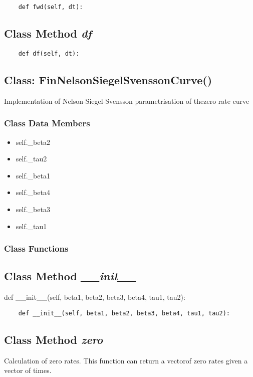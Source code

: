 \documentclass[twoside,11pt]{book}
\begin{document}
\begin{lstlisting}
    def fwd(self, dt):
\end{lstlisting}

\subsection{Class Method {\it df}}


\begin{lstlisting}
    def df(self, dt):
\end{lstlisting}

\subsection{Class: FinNelsonSiegelSvenssonCurve()}
Implementation of Nelson-Siegel-Svensson parametrisation of thezero rate curve 

\subsubsection{Class Data Members}
\begin{itemize}
\item{self.\_beta2}
\item{self.\_tau2}
\item{self.\_beta1}
\item{self.\_beta4}
\item{self.\_beta3}
\item{self.\_tau1}
\end{itemize}

\subsubsection{Class Functions}

\subsection{Class Method {\it \_\_init\_\_}}
def \_\_init\_\_(self, beta1, beta2, beta3, beta4, tau1, tau2):

\begin{lstlisting}
    def __init__(self, beta1, beta2, beta3, beta4, tau1, tau2):
\end{lstlisting}

\subsection{Class Method {\it zero}}
Calculation of zero rates. This function can return a vectorof zero rates given a vector of times. 
\end{document}
